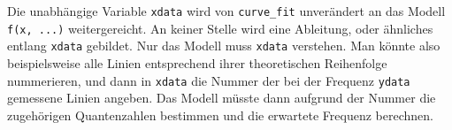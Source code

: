 Die unabhängige  Variable \texttt{xdata} wird von   \texttt{curve\_fit} unverändert an das Modell \texttt{f(x, ...)} weitergereicht. An keiner Stelle wird eine Ableitung, oder ähnliches entlang \texttt{xdata} gebildet. Nur das Modell muss \texttt{xdata} verstehen. Man könnte also beispielsweise alle  Linien entsprechend ihrer theoretischen Reihenfolge nummerieren, und dann in \texttt{xdata}  die Nummer der bei der Frequenz \texttt{ydata} gemessene Linien angeben.  Das Modell müsste dann aufgrund der Nummer die zugehörigen Quantenzahlen bestimmen und die erwartete Frequenz berechnen.


